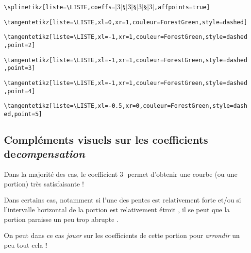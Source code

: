 \documentclass{article}
\begin{document}
{\small \verb|\splinetikz[liste=\LISTE,|\verb|coeffs=|\averb|3|\verb|§|\averb|3|\verb|§|\averb|3|\verb|§|\averb|3|\verb|,|\verb|affpoints=true|\verb|]|}

{\small \verb|\tangentetikz[liste=\LISTE,xl=0,xr=1,couleur=ForestGreen,style=dashed]|}

{\small \verb|\tangentetikz[liste=\LISTE,xl=-1,xr=1,couleur=ForestGreen,style=dashed,point=2]|}

{\small \verb|\tangentetikz[liste=\LISTE,xl=-1,xr=1,couleur=ForestGreen,style=dashed,point=3]|}

{\small \verb|\tangentetikz[liste=\LISTE,xl=-1,xr=1,couleur=ForestGreen,style=dashed,point=4]|}

{\small \verb|\tangentetikz[liste=\LISTE,xl=-0.5,xr=0,couleur=ForestGreen,style=dashed,point=5]|}

\newpage

\subsection{Compléments visuels sur les coefficients de\textit{compensation}}

Dans la majorité des cas, le coefficient \textcircled{3} permet d'obtenir une courbe (ou une portion) très satisfaisante !

Dans certains cas, notamment si l'une des pentes est relativement \og forte \fg{} et/ou si l'intervalle horizontal de la portion est relativement \og étroit \fg, il se peut que la portion paraisse un peu trop \og abrupte \fg{}.

On peut dans ce cas \textit{jouer} sur les coefficients de cette portion pour \textit{arrondir} un peu tout cela !
\end{document}
